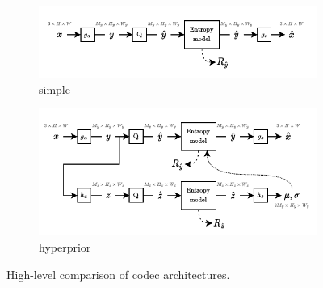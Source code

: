 \begin{figure}[htbp]
  \centering
  \begin{subfigure}{0.8\linewidth}
    \centering
    \includegraphics[width=\linewidth]{img/introduction/arch-overview-factorized.pdf}
    \caption{simple}
    \label{fig:intro/arch-comparison/factorized}
  \end{subfigure}%
  \par
  \begin{subfigure}{0.8\linewidth}
    \centering
    \includegraphics[width=\linewidth]{img/introduction/arch-overview-hyperprior.pdf}
    \caption{hyperprior}
    \label{fig:intro/arch-comparison/hyperprior}
  \end{subfigure}%
  \caption[High-level comparison of codec architectures]{%
    High-level comparison of codec architectures.%
  }
  \label{fig:intro/arch-comparison}
\end{figure}



